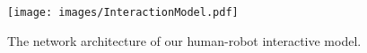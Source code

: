 \begin{figure}
\centering
\texttt{[image: images/InteractionModel.pdf]}
\vspace{-5pt}
\caption{The network architecture of our human-robot interactive model.}
\label{fig:interactiveModel}
\vspace{-10pt}
\end{figure}
